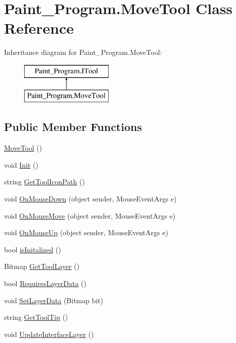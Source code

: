 \hypertarget{class_paint___program_1_1_move_tool}{}\section{Paint\+\_\+\+Program.\+Move\+Tool Class Reference}
\label{class_paint___program_1_1_move_tool}
Inheritance diagram for Paint\+\_\+\+Program.\+Move\+Tool\+:\begin{figure}[H]
\begin{center}
\leavevmode
\includegraphics[height=2.000000cm]{class_paint___program_1_1_move_tool}
\end{center}
\end{figure}
\subsection*{Public Member Functions}
\begin{DoxyCompactItemize}
\item 
\mbox{\hyperlink{class_paint___program_1_1_move_tool_a42aa998e030cffd3afd1de53927327d6}{Move\+Tool}} ()
\item 
void \mbox{\hyperlink{class_paint___program_1_1_move_tool_a4dd44350bc5ba897034dca53182ac3e5}{Init}} ()
\item 
string \mbox{\hyperlink{class_paint___program_1_1_move_tool_a6341409c4de402ff447db2c542cc6b5b}{Get\+Tool\+Icon\+Path}} ()
\item 
void \mbox{\hyperlink{class_paint___program_1_1_move_tool_a0dc263e08c2709e63672d545c0ac03c2}{On\+Mouse\+Down}} (object sender, Mouse\+Event\+Args e)
\item 
void \mbox{\hyperlink{class_paint___program_1_1_move_tool_ad5062cb79928744a0b394f927eb4a41d}{On\+Mouse\+Move}} (object sender, Mouse\+Event\+Args e)
\item 
void \mbox{\hyperlink{class_paint___program_1_1_move_tool_a64daa79217e1cadfa6ddc865369298ba}{On\+Mouse\+Up}} (object sender, Mouse\+Event\+Args e)
\item 
bool \mbox{\hyperlink{class_paint___program_1_1_move_tool_a0d0d62c93c2242302143c55071231054}{is\+Initalized}} ()
\item 
Bitmap \mbox{\hyperlink{class_paint___program_1_1_move_tool_a1d458ccea18d91c95d7da179fc3503e2}{Get\+Tool\+Layer}} ()
\item 
bool \mbox{\hyperlink{class_paint___program_1_1_move_tool_ad2ef8810a173274af16797143eae1d79}{Requires\+Layer\+Data}} ()
\item 
void \mbox{\hyperlink{class_paint___program_1_1_move_tool_a3347f2d4d15477e9c9822ea8660dfc7d}{Set\+Layer\+Data}} (Bitmap bit)
\item 
string \mbox{\hyperlink{class_paint___program_1_1_move_tool_a909f48c0aa28f1f5932b42dfa076200b}{Get\+Tool\+Tip}} ()
\item 
void \mbox{\hyperlink{class_paint___program_1_1_move_tool_aae2ece279f35913a1108e3c8a93996c3}{Update\+Interface\+Layer}} ()
\end{DoxyCompactItemize}
